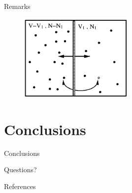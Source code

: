 \documentclass[10pt, compress, protectframetitle, handout]{beamer}
\begin{document}
\begin{frame}[allowframebreaks]{Remarks}
	\begin{figure}
		\centering
		\includegraphics[width=0.5\textwidth]{Gibbs_method}
		\label{fig:Gibbs_method}
	\end{figure}
	
\end{frame}


\section{Conclusions}

\begin{frame}{Conclusions}

	
	\begin{center}
		\Large {}
		
		\Huge\uncover<+->{\Smiley}
	\end{center}

\end{frame}

\begin{frame}[standout]
	Questions?
\end{frame}

\begin{frame}[allowframebreaks]{References}

	\nocite{*}
	
	

\end{frame}
\end{document}
